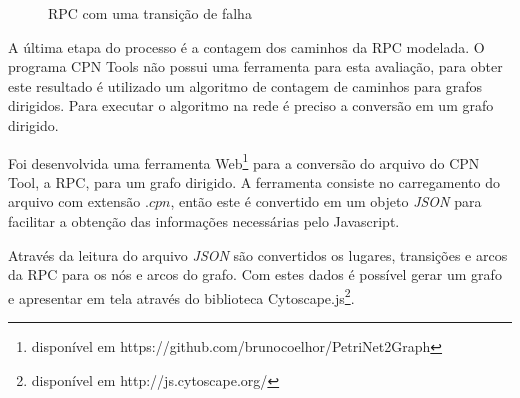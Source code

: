 \begin{figure}[ht]
  \centering
  \caption{RPC com uma transição de falha}
  \label{fig:RPC-3}
\end{figure}

A última etapa do processo é a contagem dos caminhos da RPC modelada. O programa CPN Tools não possui uma ferramenta para esta avaliação, para obter este resultado é utilizado um algoritmo de contagem de caminhos para grafos dirigidos. Para executar o algoritmo na rede é preciso a conversão em um grafo dirigido. 

Foi desenvolvida uma ferramenta Web\footnote[1]{disponível em https://github.com/brunocoelhor/PetriNet2Graph} para a conversão do arquivo do CPN Tool, a RPC, para um grafo dirigido. A ferramenta consiste no carregamento do arquivo com extensão $.cpn$, então este é convertido em um objeto \textit{JSON} para facilitar a obtenção das informações necessárias pelo Javascript.

Através da leitura do arquivo \textit{JSON} são convertidos os lugares, transições e arcos da RPC para os nós e arcos do grafo. Com estes dados é possível gerar um grafo e apresentar em tela através do biblioteca Cytoscape.js\footnote[2]{disponível em http://js.cytoscape.org/}.

